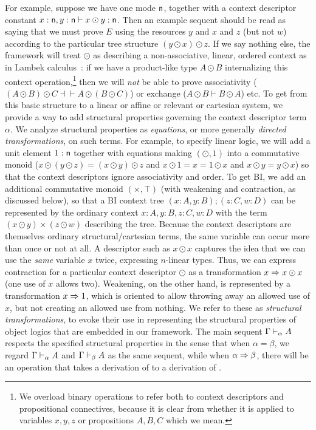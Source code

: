 For example, suppose we have one mode $\mathsf{n}$, together with a context
descriptor constant $x : \mathsf{n}, y:\mathsf{n} \vdash x \odot y : \mathsf{n}$.
Then an example sequent 
should be read as saying that we must prove $E$ using the resources $y$
and $x$ and $z$ (but not $w$) according to the particular tree structure
${(y \odot x) \odot z}$.  If we say nothing else, the framework will
treat $\odot$ as describing a non-associative, linear, ordered context
as in Lambek calculus~\citep{lambek58calculus}: if we have a
product-like type $A \odot B$ internalizing this context
operation,\footnote{We overload binary operations to refer both to
  context descriptors and propositional connectives, because it is clear
  from whether it is applied to variables $x,y,z$ or propositions
  $A,B,C$ which we mean.}  then we will \emph{not} be able to prove
associativity ($(A \odot B) \odot C \dashv\vdash A \odot (B \odot C)$)
or exchange ($A \odot B \vdash B \odot A$) etc.  
To get from this basic structure to a linear or affine or relevant or
cartesian system, we provide a way to add structural properties governing
the context descriptor term $\alpha$.  We analyze structural properties
as \emph{equations}, or more generally \emph{directed transformations},
on such terms.  For example, to specify linear logic, we will add a unit
element $1 : \mathsf{n}$ together with equations making $(\odot,1)$ into a
commutative monoid ($x \odot (y \odot z) = (x \odot y) \odot z$ and 
$x \odot 1 = x = 1 \odot x$ and 
$x \odot y = y \odot x$)
so that the context descriptors ignore associativity and order.  To get
BI, we add an additional commutative monoid $(\times,\top)$ (with
weakening and contraction, as discussed below), so that a BI context
tree $(x:A,y:B);(z:C,w:D)$ can be represented by the ordinary context
$x:A,y:B,z:C,w:D$ with the term $(x \odot y) \times (z \odot w)$
describing the tree.  Because the context descriptors are themselves
ordinary structural/cartesian terms, the same variable can occur more
than once or not at all.  A descriptor such as $x \odot x$ captures the
idea that we can use the \emph{same} variable $x$ twice, expressing
$n$-linear types.  Thus, we can express contraction for a particular
context descriptor $\odot$ as a transformation $x \Rightarrow x \odot x$ (one
use of $x$ allows two).  Weakening, on the other hand, is represented by
a transformation $x \Rightarrow 1$, which is oriented to allow throwing away an
allowed use of $x$, but not creating an allowed use from nothing.  We
refer to these as \emph{structural transformations}, to evoke their use
in representing the structural properties of object logics that are
embedded in our framework.  The main sequent $\Gamma \vdash_{\alpha} A$
respects the specified structural properties in the sense that when
$\alpha = \beta$, we regard $\Gamma \vdash_{\alpha} A$ and
$\Gamma \vdash_{\beta} A$ as the same sequent, while when $\alpha \Rightarrow
\beta$, there will be an operation that takes a derivation of
 to a derivation of .

